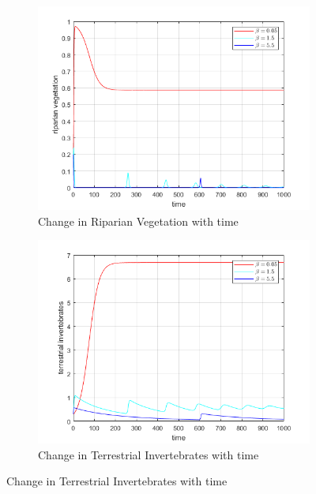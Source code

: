 \documentclass[12pt]{article}
\numberwithin{equation}{section}
\begin{document}
\FloatBarrier
\begin{figure}[bp!]
	\centering
	\begin{subfigure}[t]{0.45\textwidth}
		\centering
	\includegraphics[width=\textwidth]{time_vs_riparian_beta.png}
		\caption{Change in Riparian Vegetation with time} \label{fig:time_vs_riparian_beta}
	\end{subfigure}
\hspace{0.08\textwidth}
        \begin{subfigure}[t]{0.45\textwidth}
                 \centering
         \includegraphics[width=\textwidth]{time_vs_invertebrates_beta.png}
		\caption{Change in Terrestrial Invertebrates with time} \label{fig:time_vs_invertebrates_beta}
	\end{subfigure}

\end{figure}
\end{document}
